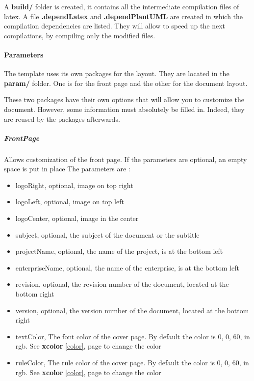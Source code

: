 A \textbf{build/} folder is created, it contains all the intermediate compilation files of \gls{latex}.
A file \textbf{.dependLatex} and \textbf{.dependPlantUML} are created in which the compilation dependencies are listed.
They will allow to speed up the next compilations, by compiling only the modified files.

\paragraph{Parameters}
The template uses its own packages for the layout.
They are located in the \textbf{param/} folder.
One is for the front page and the other for the document layout.

These two packages have their own options that will allow you to customize the document.
However, some information must absolutely be filled in. Indeed, they are reused by the packages afterwards.

\subparagraph{FrontPage}
Allows customization of the front page. If the parameters are optional, an empty space is put in place
The parameters are :
\begin{itemize}
    \item logoRight, optional, image on top right
    \item logoLeft, optional, image on top left
    \item logoCenter, optional, image in the center
    \item subject, optional, the subject of the document or the subtitle
    \item projectName, optional, the name of the project, is at the bottom left
    \item enterpriseName, optional, the name of the enterprise, is at the bottom left
    \item revision, optional, the revision number of the document, located at the bottom right
    \item version, optional, the version number of the document, located at the bottom right
    \item textColor, The font color of the cover page. By default the color is 0, 0, 60, in rgb. See \textbf{xcolor} \ref{color}, page \pageref{color} to change the color
    \item ruleColor, The rule color of the cover page. By default the color is 0, 0, 60, in rgb. See \textbf{xcolor} \ref{color}, page \pageref{color} to change the color
\end{itemize}

